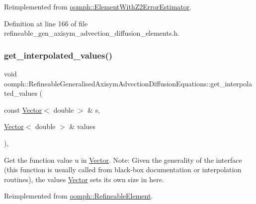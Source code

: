 Reimplemented from \hyperlink{classoomph_1_1ElementWithZ2ErrorEstimator_ad2add457436f34d0d4b9e48900be309c}{oomph\+::\+Element\+With\+Z2\+Error\+Estimator}.



Definition at line 166 of file refineable\+\_\+gen\+\_\+axisym\+\_\+advection\+\_\+diffusion\+\_\+elements.\+h.

\mbox{\label{classoomph_1_1RefineableGeneralisedAxisymAdvectionDiffusionEquations_a1de11bc60b5ff64c82d53987f73aee38}} 
\subsubsection{\texorpdfstring{get\+\_\+interpolated\+\_\+values()}{get\_interpolated\_values()}\hspace{0.1cm}{\footnotesize\ttfamily [1/2]}}
{\footnotesize\ttfamily void oomph\+::\+Refineable\+Generalised\+Axisym\+Advection\+Diffusion\+Equations\+::get\+\_\+interpolated\+\_\+values (\begin{DoxyParamCaption}\item[{const \hyperlink{classoomph_1_1Vector}{Vector}$<$ double $>$ \&}]{s,  }\item[{\hyperlink{classoomph_1_1Vector}{Vector}$<$ double $>$ \&}]{values }\end{DoxyParamCaption})\hspace{0.3cm}{\ttfamily [inline]}, {\ttfamily [virtual]}}



Get the function value u in \hyperlink{classoomph_1_1Vector}{Vector}. Note\+: Given the generality of the interface (this function is usually called from black-\/box documentation or interpolation routines), the values \hyperlink{classoomph_1_1Vector}{Vector} sets its own size in here. 



Reimplemented from \hyperlink{classoomph_1_1RefineableElement_ad9a4f92880668a2373326d8306365c43}{oomph\+::\+Refineable\+Element}.



